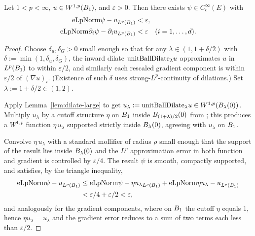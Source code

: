 \begin{theorem}
\label{thm:oneshot}
\leanok
{}
Let $1 < p < \infty$, $u \in W^{1,p}(B_{1})$, and $\varepsilon > 0$. Then
there exists $\psi \in C^\infty_c(E)$ with
\begin{align*}
\mathrm{eLpNorm}{\psi - u}_{L^p(B_{1})} &< \varepsilon, \\
\mathrm{eLpNorm}{\partial_i \psi - \partial_i u}_{L^p(B_{1})} &< \varepsilon
\quad (i=1,\dots,d).
\end{align*}
\end{theorem}

\begin{proof}
\leanok
{}

Choose $\delta_u, \delta_G > 0$ small enough so that for any
$\lambda \in (1, 1+\delta/2)$ with $\delta := \min(1,\delta_u,\delta_G)$,
the inward dilate $\mathrm{unitBallDilate}_\lambda u$ approximates $u$ in $L^p(B_{1})$
to within $\varepsilon/2$, and similarly each rescaled gradient component is
within $\varepsilon/2$ of $(\nabla u)_i$. (Existence of such $\delta$ uses
strong-$L^p$-continuity of dilations.) Set $\lambda := 1 + \delta/2 \in (1,2)$.

Apply Lemma~\ref{lem:dilate-large} to get
$u_\lambda := \mathrm{unitBallDilate}_\lambda u \in W^{1,p}(B_{\lambda}(0))$.
Multiply $u_\lambda$ by a cutoff structure $\eta$ on $B_{1}$ inside
$B_{(1+\lambda)/2}(0)$ from ; this
produces a $W^{1,p}$ function $\eta\, u_\lambda$ supported strictly inside
$B_{\lambda}(0)$, agreeing with $u_\lambda$ on $B_{1}$.

Convolve $\eta\, u_\lambda$ with a standard mollifier of radius $\rho$ small
enough that the support of the result lies inside $B_{\lambda}(0)$ and the
$L^p$ approximation error in both function and gradient is controlled by
$\varepsilon/4$. The result $\psi$ is smooth, compactly supported, and
satisfies, by the triangle inequality,
\begin{align*}
\mathrm{eLpNorm}{\psi - u}_{L^p(B_{1})}
&\le \mathrm{eLpNorm}{\psi - \eta u_\lambda}_{L^p(B_{1})}
+ \mathrm{eLpNorm}{\eta u_\lambda - u}_{L^p(B_{1})} \\
&< \varepsilon/4 + \varepsilon/2 < \varepsilon,
\end{align*}
and analogously for the gradient components, where on $B_{1}$ the cutoff
$\eta$ equals $1$, hence $\eta u_\lambda = u_\lambda$ and the gradient
error reduces to a sum of two terms each less than $\varepsilon/2$.
\end{proof}


